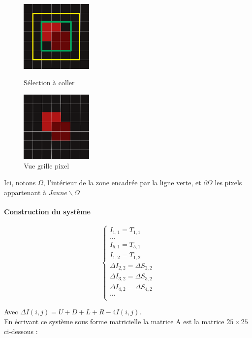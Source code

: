 \begin{figure}[!htb]
   \begin{minipage}{0.5\textwidth}
     \centering
     \includegraphics[width = 100pt]{Images/carre_selection.png}
\caption{Sélection à coller}
      \end{minipage}\hfill
         \begin{minipage}{0.5\textwidth}
     \centering
     \includegraphics[width = 100pt]{Images/pix.png}
\caption{Vue grille pixel}
      \end{minipage}\hfill
      \end{figure}
\newpage

Ici, notons $\Omega$, l'intérieur de la zone encadrée par la ligne verte, et $\partial \Omega$ les pixels appartenant à $Jaune \backslash \Omega$


\paragraph{Construction du système}
\begin{center}
\begin{equation}
\left\{
\begin{aligned}
I_{1,1} = T_{1,1}\\
...\\
I_{5,1} = T_{5,1}\\
I_{1,2} = T_{1,2}\\
\Delta I_{2,2} = \Delta S_{2,2}\\
\Delta I_{3,2} = \Delta S_{3,2}\\
\Delta I_{4,2} = \Delta S_{4,2}\\
...\\
\end{aligned}
\right.
\end{equation}
\end{center}
Avec $\Delta I(i,j) = U+D+L+R-4I(i,j)$.\\
En écrivant ce système sous forme matricielle la matrice A est la matrice $25\times 25$ ci-dessous :  

